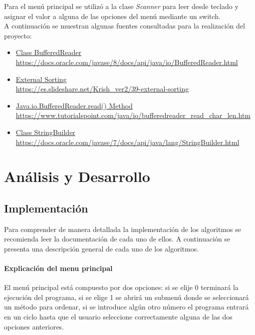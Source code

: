 \documentclass{article}
\begin{document}
	Para el menú principal se utilizó a la clase \textit{Scanner} para leer desde teclado y asignar el valor a alguna de las opciones del menú mediante un switch.\\
	
	A continuación se muestran algunas fuentes consultadas para la realización del proyecto:
	
	\begin{itemize}
		\item  \href{https://docs.oracle.com/javase/8/docs/api/java/io/BufferedReader.html}{Class BufferedReader}\\
		\url{https://docs.oracle.com/javase/8/docs/api/java/io/BufferedReader.html}
		
		\item \href{https://es.slideshare.net/Krish_ver2/39-external-sorting}{External Sorting}\\
		\url{https://es.slideshare.net/Krish_ver2/39-external-sorting}
		
		\item \href{https://www.tutorialspoint.com/java/io/bufferedreader_read_char_len.htm}{Java.io.BufferedReader.read() Method}\\
		\url{https://www.tutorialspoint.com/java/io/bufferedreader_read_char_len.htm}
		
		\item \href{https://docs.oracle.com/javase/7/docs/api/java/lang/StringBuilder.html}{Class StringBuilder}\\
		\url{https://docs.oracle.com/javase/7/docs/api/java/lang/StringBuilder.html}
	\end{itemize}
	
	\section{Análisis y Desarrollo}
		
	\subsection{Implementación}
	 Para comprender de manera detallada la implementación de los algoritmos se recomienda leer la documentación de cada uno de ellos.
	 A continuación se presenta una descripción general de cada uno de los algoritmos.
	
	\paragraph*{Explicación del menu principal}
	El menú principal está compuesto por dos opciones: si se elije 0 terminará la ejecución del programa, si se elige 1 se abrirá un submenú donde
	se seleccionará un método para ordenar, si se introduce algún otro número el programa entrará en un ciclo hasta que el usuario seleccione
	correctamente alguna de las dos opciones anteriores.\\
	
\end{document}
